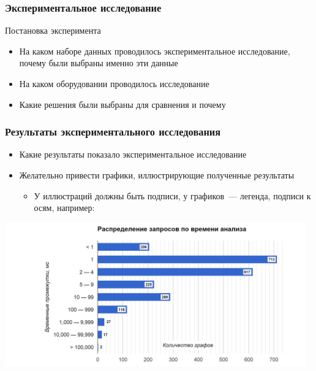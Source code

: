 \documentclass
  [aspectratio=1610] %
  {beamer}
\begin{document}
\begin{frame}[t]
    \frametitle{Экспериментальное исследование}
    Постановка эксперимента
    \begin{itemize}
        \item На каком наборе данных проводилось экспериментальное исследование, почему были выбраны именно эти данные
        \item На каком оборудовании проводилось исследование
        \item Какие решения были выбраны для сравнения и почему
    \end{itemize}
\end{frame}

\begin{frame}[t]
    \frametitle{Результаты экспериментального исследования}
    \begin{itemize}
        \item Какие результаты показало экспериментальное исследование
        \item Желательно привести графики, иллюстрирующие полученные результаты
              \begin{itemize}
                  \item У иллюстраций должны быть подписи, у графиков~--- легенда, подписи к осям, например:
              \end{itemize}
    \end{itemize}
    \includegraphics[width=13cm]{figures/dist.png}
\end{frame}
\end{document}

